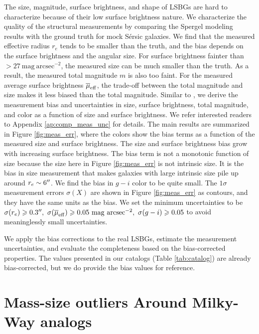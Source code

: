 \documentclass[twocolumn,astrosymb,twocolappendix,linenumbers]{aastex631}
\newcommand{\sbunit}{\mathrm{mag\ arcsec}^{-2}}
\newcommand{\sersic}{S\'ersic}
\begin{document}
\begin{CJK*}{UTF8}{gbsn}
The size, magnitude, surface brightness, and shape of LSBGs are hard to characterize because of their low surface brightness nature. We characterize the quality of the structural measurements by comparing the Spergel modeling results with the ground truth for mock \sersic{} galaxies. We find that the measured effective radius $r_e$ tends to be smaller than the truth, and the bias depends on the surface brightness and the angular size. For surface brightness fainter than $>27\ \sbunit$, the measured size can be much smaller than the truth. As a result, the measured total magnitude $m$ is also too faint. For the measured average surface brightness $\overline{\mu}_{\rm eff}$, the trade-off between the total magnitude and size makes it less biased than the total magnitude. Similar to \citet{Zaritsky2021}, we derive the measurement bias and uncertainties in size, surface brightness, total magnitude, and color as a function of size and surface brightness. We refer interested readers to Appendix \ref{ap:comp_meas_unc} for details. The main results are summarized in Figure \ref{fig:meas_err}, where the colors show the bias terms as a function of the measured size and surface brightness. The size and surface brightness bias grow with increasing surface brightness. The bias term is not a monotonic function of size because the size here in Figure \ref{fig:meas_err} is not intrinsic size. It is the bias in size measurement that makes galaxies with large intrinsic size pile up around $r_e\sim 6\mbox{$^{\prime\prime}$}$. We find the bias in $g-i$ color to be quite small. The $1\sigma$ measurement errors $\sigma(X)$ are shown in Figure \ref{fig:meas_err} as contours, and they have the same units as the bias. We set the minimum uncertainties to be $\sigma(r_e) \geqslant 0.3\arcsec,\ \sigma(\overline{\mu}_{\rm eff}) \geqslant 0.05\ \sbunit,\ \sigma(g-i) \geqslant 0.05$ to avoid meaninglessly small uncertainties. 

We apply the bias corrections to the real LSBGs, estimate the measurement uncertainties, and evaluate the completeness based on the bias-corrected properties. 
The values presented in our catalogs (Table \ref{tab:catalog}) are already bias-corrected, but we do provide the bias values for reference. 


\section{Mass-size outliers Around Milky-Way analogs}\label{sec:sample_construction}



\end{CJK*}
\end{document}

